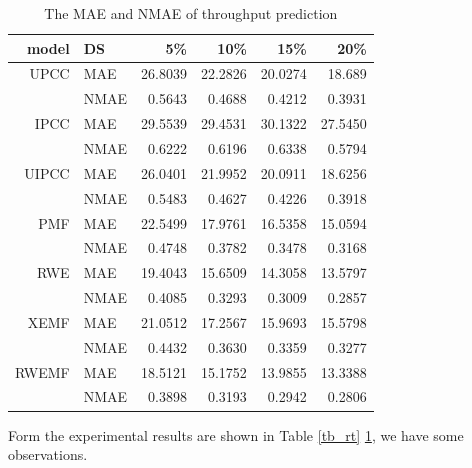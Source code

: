 \documentclass[conference]{IEEEtran}
\begin{document}
\begin{table}[H]
  \centering
  \caption{The MAE and NMAE of throughput prediction}
  \label{tb_tp}
    \begin{tabular}{r||l|rrrr}
\hline
model & DS & 5\% & 10\% & 15\% & 20\% \\
\hline
UPCC & MAE & 26.8039 & 22.2826 & 20.0274 & 18.689 \\
   & NMAE & 0.5643 & 0.4688 & 0.4212 & 0.3931 \\
\hline
IPCC & MAE & 29.5539 & 29.4531 & 30.1322 & 27.5450 \\
   & NMAE & 0.6222 & 0.6196 & 0.6338 & 0.5794 \\
\hline
UIPCC & MAE & 26.0401 & 21.9952 & 20.0911 & 18.6256 \\
   & NMAE & 0.5483 & 0.4627 & 0.4226 & 0.3918 \\
\hline
PMF & MAE & 22.5499 & 17.9761 & 16.5358 & 15.0594 \\
   & NMAE & 0.4748 & 0.3782 & 0.3478 & 0.3168 \\
\hline
RWE & MAE & 19.4043 & 15.6509 & 14.3058 & 13.5797 \\
   & NMAE & 0.4085 & 0.3293 & 0.3009 & 0.2857 \\
\hline
XEMF & MAE & 21.0512 & 17.2567 & 15.9693 & 15.5798 \\
   & NMAE & 0.4432 & 0.3630 & 0.3359 & 0.3277 \\
\hline
RWEMF & MAE & 18.5121 & 15.1752 & 13.9855 & 13.3388 \\
   & NMAE & 0.3898 & 0.3193 & 0.2942 & 0.2806 \\
\hline
    \end{tabular}
\end{table}

\par Form the experimental results are shown in Table \ref{tb_rt} \ref{tb_tp}, we have some observations. 
\end{document}
